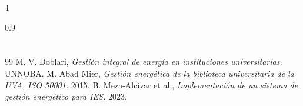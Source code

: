 \documentclass[a0,landscape]{a0poster}
\begin{document}
\begin{multicols}{4}
\begin{spacing}{0.9}
\section*{}

{\large
\begin{thebibliography}{99}
     M. V. Doblari, \textit{Gesti\'{o}n integral de energ\'{i}a en instituciones universitarias.} UNNOBA.
     M. Abad Mier, \textit{Gesti\'{o}n energ\'{e}tica de la biblioteca universitaria de la UVA, ISO 50001.} 2015.
     B. Meza-Alc\'{i}var et al., \textit{Implementaci\'{o}n de un sistema de gesti\'{o}n energ\'{e}tico para IES.} 2023.
\end{thebibliography}}

\end{spacing}
\end{multicols}
\end{document}
